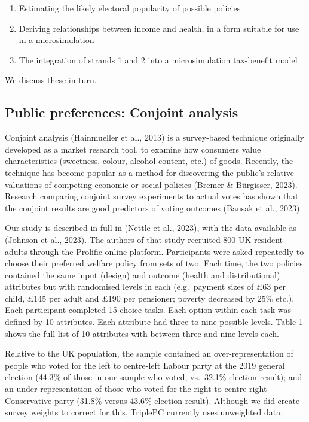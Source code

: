 \documentclass[
  letterpaper,
  DIV=11,
  numbers=noendperiod]{scrartcl}
\providecommand{\tightlist}{%
  \setlength{\itemsep}{0pt}\setlength{\parskip}{0pt}}\usepackage{longtable,booktabs,array}
\begin{document}
\begin{enumerate}
\def\labelenumi{\arabic{enumi}.}
\tightlist
\item
  Estimating the likely electoral popularity of possible policies\\
\item
  Deriving relationships between income and health, in a form suitable
  for use in a microsimulation
\item
  The integration of strands 1 and 2 into a microsimulation tax-benefit
  model
\end{enumerate}

We discuss these in turn.

\subsection{Public preferences: Conjoint
analysis}\label{public-preferences-conjoint-analysis}

Conjoint analysis (Hainmueller et al., 2013) is a survey-based technique
originally developed as a market research tool, to examine how consumers
value characteristics (sweetness, colour, alcohol content, etc.) of
goods. Recently, the technique has become popular as a method for
discovering the public's relative valuations of competing economic or
social policies (Bremer \& Bürgisser, 2023). Research comparing conjoint
survey experiments to actual votes has shown that the conjoint results
are good predictors of voting outcomes (Bansak et al., 2023).

Our study is described in full in (Nettle et al., 2023), with the data
available as (Johnson et al., 2023). The authors of that study recruited
800 UK resident adults through the Prolific online platform.
Participants were asked repeatedly to choose their preferred welfare
policy from sets of two. Each time, the two policies contained the same
input (design) and outcome (health and distributional) attributes but
with randomised levels in each (e.g.~payment sizes of £63 per child,
£145 per adult and £190 per pensioner; poverty decreased by 25\% etc.).
Each participant completed 15 choice tasks. Each option within each task
was defined by 10 attributes. Each attribute had three to nine possible
levels. Table 1 shows the full list of 10 attributes with between three
and nine levels each.

Relative to the UK population, the sample contained an
over-representation of people who voted for the left to centre-left
Labour party at the 2019 general election (44.3\% of those in our sample
who voted, vs.~32.1\% election result); and an under-representation of
those who voted for the right to centre-right Conservative party (31.8\%
versus 43.6\% election result). Although we did create survey weights to
correct for this, TriplePC currently uses unweighted data.
\end{document}
